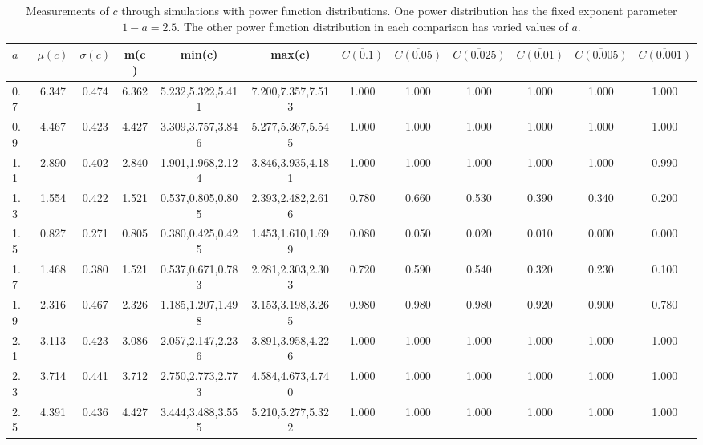 \begin{table*}[h!]
\begin{center}
\begin{tabular}{| l | c | c | c | c | c | c | c | c | c | c | c |}\hline
$a$ & $\mu(c)$ & $\sigma(c)$ & m(c) & min(c) & max(c) & $\overline{C(0.1)}$ & $\overline{C(0.05)}$ & $\overline{C(0.025)}$ & $\overline{C(0.01)}$ & $\overline{C(0.005)}$ & $\overline{C(0.001)}$ \\\hline
0.7 & 6.347 & 0.474 & 6.362 & 5.232,5.322,5.411 & 7.200,7.357,7.513  & 1.000  & 1.000  & 1.000  & 1.000  & 1.000  & 1.000 \\\hline
0.9 & 4.467 & 0.423 & 4.427 & 3.309,3.757,3.846 & 5.277,5.367,5.545  & 1.000  & 1.000  & 1.000  & 1.000  & 1.000  & 1.000 \\\hline
1.1 & 2.890 & 0.402 & 2.840 & 1.901,1.968,2.124 & 3.846,3.935,4.181  & 1.000  & 1.000  & 1.000  & 1.000  & 1.000  & 0.990 \\\hline
1.3 & 1.554 & 0.422 & 1.521 & 0.537,0.805,0.805 & 2.393,2.482,2.616  & 0.780  & 0.660  & 0.530  & 0.390  & 0.340  & 0.200 \\\hline
1.5 & 0.827 & 0.271 & 0.805 & 0.380,0.425,0.425 & 1.453,1.610,1.699  & 0.080  & 0.050  & 0.020  & 0.010  & 0.000  & 0.000 \\\hline
1.7 & 1.468 & 0.380 & 1.521 & 0.537,0.671,0.783 & 2.281,2.303,2.303  & 0.720  & 0.590  & 0.540  & 0.320  & 0.230  & 0.100 \\\hline
1.9 & 2.316 & 0.467 & 2.326 & 1.185,1.207,1.498 & 3.153,3.198,3.265  & 0.980  & 0.980  & 0.980  & 0.920  & 0.900  & 0.780 \\\hline
2.1 & 3.113 & 0.423 & 3.086 & 2.057,2.147,2.236 & 3.891,3.958,4.226  & 1.000  & 1.000  & 1.000  & 1.000  & 1.000  & 1.000 \\\hline
2.3 & 3.714 & 0.441 & 3.712 & 2.750,2.773,2.773 & 4.584,4.673,4.740  & 1.000  & 1.000  & 1.000  & 1.000  & 1.000  & 1.000 \\\hline
2.5 & 4.391 & 0.436 & 4.427 & 3.444,3.488,3.555 & 5.210,5.277,5.322  & 1.000  & 1.000  & 1.000  & 1.000  & 1.000  & 1.000 \\\hline
\end{tabular}
\caption{Measurements of $c$ through simulations
        with power function distributions.
        One power distribution has the fixed exponent parameter $1-a=2.5$.
        The other power function distribution in each comparison
        has varied values of $a$.}
\end{center}
\end{table*}